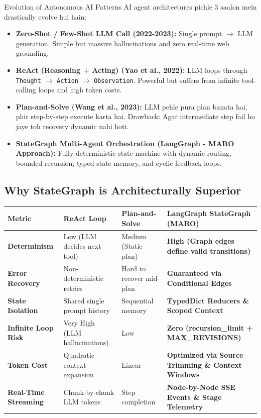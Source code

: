\documentclass[11pt,a4paper,twoside]{report}
\begin{document}
\begin{conceptbox}{Evolution of Autonomous AI Patterns}
AI agent architectures pichle 3 saalon mein drastically evolve hui hain:

\begin{itemize}
    \item \textbf{Zero-Shot / Few-Shot LLM Call (2022-2023):} Single prompt $\rightarrow$ LLM generation. Simple but massive hallucinations and zero real-time web grounding.
    \item \textbf{ReAct (Reasoning + Acting) (Yao et al., 2022):} LLM loops through \texttt{Thought} $\rightarrow$ \texttt{Action} $\rightarrow$ \texttt{Observation}. Powerful but suffers from infinite tool-calling loops and high token costs.
    \item \textbf{Plan-and-Solve (Wang et al., 2023):} LLM pehle pura plan banata hai, phir step-by-step execute karta hai. Drawback: Agar intermediate step fail ho jaye toh recovery dynamic nahi hoti.
    \item \textbf{StateGraph Multi-Agent Orchestration (LangGraph - MARO Approach):} Fully deterministic state machine with dynamic routing, bounded recursion, typed state memory, and cyclic feedback loops.
\end{itemize}
\end{conceptbox}

\subsection{Why StateGraph is Architecturally Superior}

\begin{center}
\begin{longtable}{|p{3.2cm}|p{3.8cm}|p{3.8cm}|p{3.8cm}|}
\hline
\textbf{Metric} & \textbf{ReAct Loop} & \textbf{Plan-and-Solve} & \textbf{LangGraph StateGraph (MARO)} \\
\hline
\endhead
\textbf{Determinism} & Low (LLM decides next tool) & Medium (Static plan) & \textbf{High (Graph edges define valid transitions)} \\
\hline
\textbf{Error Recovery} & Non-deterministic retries & Hard to recover mid-plan & \textbf{Guaranteed via Conditional Edges} \\
\hline
\textbf{State Isolation} & Shared single prompt history & Sequential memory & \textbf{TypedDict Reducers \& Scoped Context} \\
\hline
\textbf{Infinite Loop Risk} & Very High (LLM hallucinations) & Low & \textbf{Zero (recursion\_limit + MAX\_REVISIONS)} \\
\hline
\textbf{Token Cost} & Quadratic context expansion & Linear & \textbf{Optimized via Source Trimming \& Context Windows} \\
\hline
\textbf{Real-Time Streaming} & Chunk-by-chunk LLM tokens & Step completion & \textbf{Node-by-Node SSE Events \& Stage Telemetry} \\
\hline
\end{longtable}
\end{center}
\end{document}
